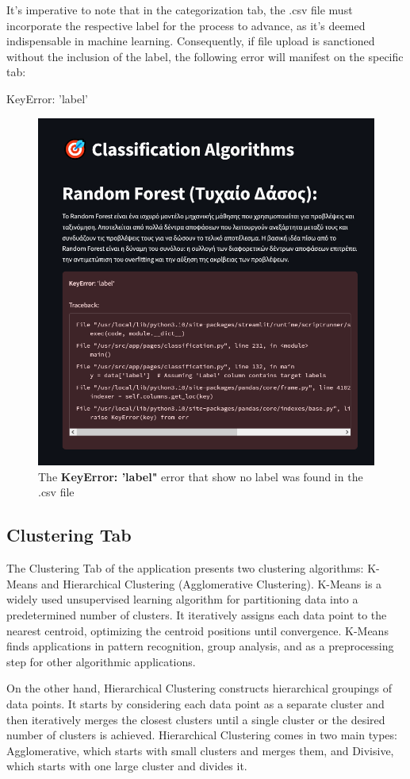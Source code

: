 \documentclass[unnumsec,webpdf,contemporary,large]{oup-authoring-template}%
\theoremstyle{thmstyleone}%
\theoremstyle{thmstyletwo}%
\theoremstyle{thmstylethree}%
\begin{document}
It's imperative to note that in the categorization tab, the .csv file must incorporate the respective label for the process to advance, as it's deemed indispensable in machine learning. Consequently, if file upload is sanctioned without the inclusion of the label, the following error will manifest on the specific tab:

KeyError: 'label'

\begin{figure}
    \centering
    \includegraphics[width=0.4\linewidth]{error-classification.png}
    \caption{The \textbf{KeyError: 'label"} error that show no label was found in the .csv file}
    \label{fig:error-classification}
\end{figure}

\subsection{\textbf{Clustering Tab}}
\vspace{0.2cm}

The Clustering Tab of the application presents two clustering algorithms: K-Means and Hierarchical Clustering (Agglomerative Clustering). K-Means is a widely used unsupervised learning algorithm for partitioning data into a predetermined number of clusters. It iteratively assigns each data point to the nearest centroid, optimizing the centroid positions until convergence. K-Means finds applications in pattern recognition, group analysis, and as a preprocessing step for other algorithmic applications. 
\vspace{0.2cm}

On the other hand, Hierarchical Clustering constructs hierarchical groupings of data points. It starts by considering each data point as a separate cluster and then iteratively merges the closest clusters until a single cluster or the desired number of clusters is achieved. Hierarchical Clustering comes in two main types: Agglomerative, which starts with small clusters and merges them, and Divisive, which starts with one large cluster and divides it. 
\vspace{0.2cm}
\end{document}
